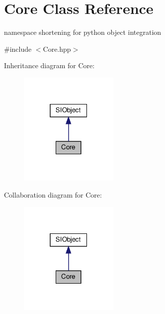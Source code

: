 \hypertarget{class_core}{}\section{Core Class Reference}
\label{class_core}


namespace shortening for python object integration  




{\ttfamily \#include $<$Core.\+hpp$>$}



Inheritance diagram for Core\+:\nopagebreak
\begin{figure}[H]
\begin{center}
\leavevmode
\includegraphics[width=135pt]{class_core__inherit__graph}
\end{center}
\end{figure}


Collaboration diagram for Core\+:\nopagebreak
\begin{figure}[H]
\begin{center}
\leavevmode
\includegraphics[width=135pt]{class_core__coll__graph}
\end{center}
\end{figure}
